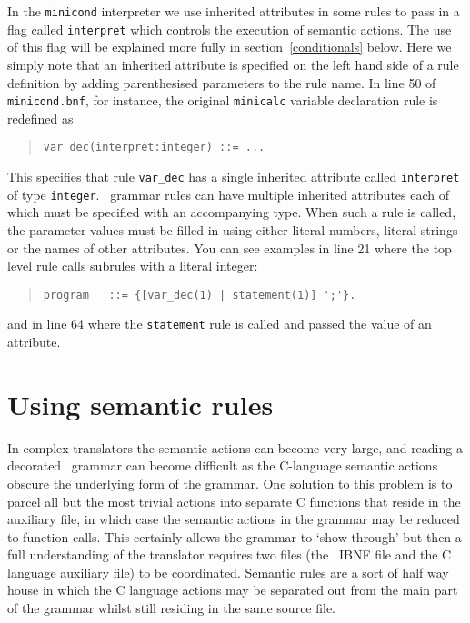 In the {\tt minicond} interpreter we use inherited attributes in some rules to pass in a flag
called {\tt interpret} which controls the execution of semantic actions. The use of this
flag will be explained more fully in section~\ref{conditionals} below. Here we simply note
that an inherited attribute is specified on the left hand side of a rule definition by
adding parenthesised parameters to the rule name. In line 50 of {\tt minicond.bnf}, for instance,
the original {\tt minicalc} variable declaration rule is redefined as
\begin{quote}
\small
\begin{verbatim}
var_dec(interpret:integer) ::= ...
\end{verbatim}
\end{quote}
This specifies that rule \verb+var_dec+ has a single inherited attribute called {\tt interpret}
of type {\tt integer}. \rdp\ grammar rules can have multiple inherited attributes each of
which must be specified with an accompanying type. When such a rule is called, the parameter
values must be filled in using either literal numbers, literal strings or the names of other 
attributes. You can see examples in line 21 where the top level rule calls subrules with a literal
integer:
\begin{quote}
\small
\begin{verbatim}    
program   ::= {[var_dec(1) | statement(1)] ';'}.
\end{verbatim}
\end{quote}
and in line 64 where the {\tt statement} rule is called and passed the value of an attribute.

\section{Using semantic rules}

In complex translators the semantic actions can become very large, and
reading a decorated \rdp\ grammar can become difficult as the C-language
semantic actions obscure the underlying form of the grammar. One
solution to this problem is to parcel all but the most trivial actions
into separate C functions that reside in the auxiliary file, in which
case the semantic actions in the grammar may be reduced to function
calls. This certainly allows the grammar to `show through' but then a full
understanding of the translator requires two files (the \rdp\ IBNF file and the C
language auxiliary file) to be coordinated. Semantic rules are a sort of half way
house in which the C language actions may be separated out from the main part of the
grammar whilst still residing in the same source file.

